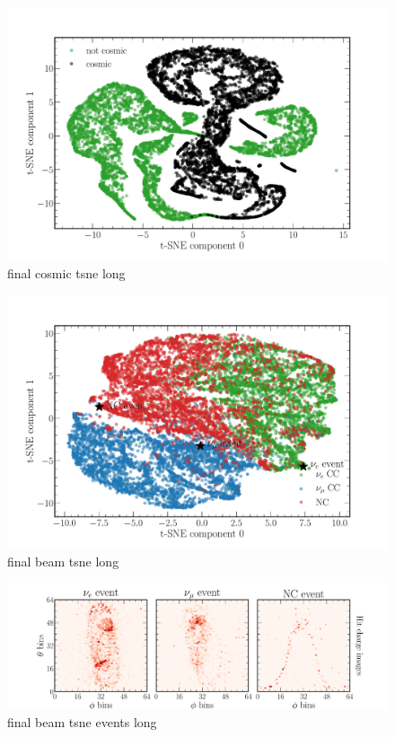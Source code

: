 \begin{figure}
    \includegraphics[width=\textwidth]{diagrams/6-cvn/chipsnet/final_cosmic_tsne.pdf}
    \caption[final cosmic tsne short]
    {final cosmic tsne long}
    \label{fig:final_cosmic_tsne}
\end{figure}

\begin{figure}
    \includegraphics[width=\textwidth]{diagrams/6-cvn/chipsnet/final_beam_tsne.pdf}
    \caption[final beam tsne short]
    {final beam tsne long}
    \label{fig:final_beam_tsne}
\end{figure}

\begin{figure}
    \includegraphics[width=\textwidth]{diagrams/6-cvn/chipsnet/final_beam_tsne_events.pdf}
    \caption[final beam tsne events short]
    {final beam tsne events long}
    \label{fig:final_beam_tsne_events}
\end{figure}

